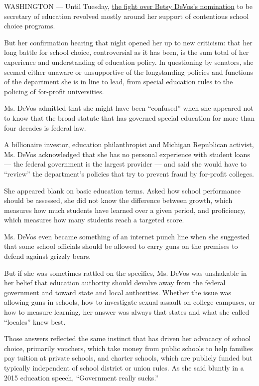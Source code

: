 WASHINGTON --- Until Tuesday,
\href{https://mobile.nytimes.com/2017/01/12/us/politics/betsy-devos-education.html}{the
fight over Betsy DeVos's nomination} to be secretary of education
revolved mostly around her support of contentious school choice
programs.

But her confirmation hearing that night opened her up to new criticism:
that her long battle for school choice, controversial as it has been, is
the sum total of her experience and understanding of education policy.
In questioning by senators, she seemed either unaware or unsupportive of
the longstanding policies and functions of the department she is in line
to lead, from special education rules to the policing of for-profit
universities.

Ms. DeVos admitted that she might have been ``confused'' when she
appeared not to know that the broad statute that has governed special
education for more than four decades is federal law.

A billionaire investor, education philanthropist and Michigan Republican
activist, Ms. DeVos acknowledged that she has no personal experience
with student loans --- the federal government is the largest provider
--- and said she would have to ``review'' the department's policies that
try to prevent fraud by for-profit colleges.

She appeared blank on basic education terms. Asked how school
performance should be assessed, she did not know the difference between
growth, which measures how much students have learned over a given
period, and proficiency, which measures how many students reach a
targeted score.

Ms. DeVos even became something of an internet punch line when she
suggested that some school officials should be allowed to carry guns on
the premises to defend against grizzly bears.

But if she was sometimes rattled on the specifics, Ms. DeVos was
unshakable in her belief that education authority should devolve away
from the federal government and toward state and local authorities.
Whether the issue was allowing guns in schools, how to investigate
sexual assault on college campuses, or how to measure learning, her
answer was always that states and what she called ``locales'' knew best.

Those answers reflected the same instinct that has driven her advocacy
of school choice, primarily vouchers, which take money from public
schools to help families pay tuition at private schools, and charter
schools, which are publicly funded but typically independent of school
district or union rules. As she said bluntly in a 2015 education speech,
``Government really sucks.''

